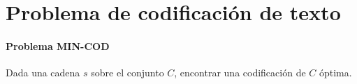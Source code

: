 \section*{Problema de codificación de texto}

\paragraph{Problema MIN-COD}
Dada una cadena $s$ sobre el conjunto $C$, encontrar una codificación de $C$ óptima.

